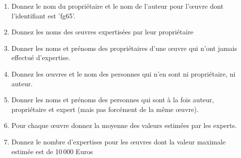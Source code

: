 \begin{enumerate}
  \item Donnez le nom du propriétaire et le nom de l'auteur pour l'{\oe}uvre dont l'identifiant est 'fg65'.

  \item Donnez les noms des {\oe}uvres expertisées par  leur propriétaire

\item Donner les noms et prénoms des propriétaires d'une {\oe}uvre qui n'ont jamais effectué d'expertise.

\item Donnez les {\oe}uvres et le nom des personnes qui n'en sont ni propriétaire, ni auteur.

\item Donner les noms et prénoms des personnes qui sont à la fois auteur, propriétaire et expert (mais pas forcément
     de la même {\oe}uvre).

\item Pour chaque {\oe}uvre donnez la moyenne des valeurs estimées par les experts.

\item Donnez le nombre d'expertises pour les {\oe}uvres dont la valeur maximale estimée est de 10\,000 Euros


\end{enumerate}

